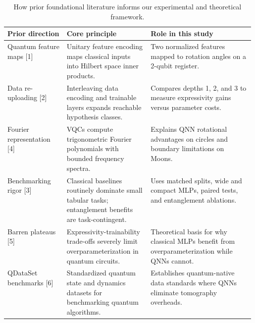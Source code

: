 \begin{table}[!htbp]
\centering\small
\caption{How prior foundational literature informs our experimental and theoretical framework.}
\begin{tabularx}{\linewidth}{@{}p{0.24\linewidth}>{\raggedright\arraybackslash}p{0.34\linewidth}>{\raggedright\arraybackslash}X@{}}
\toprule
Prior direction & Core principle & Role in this study\\
\midrule
Quantum feature maps [1] & Unitary feature encoding maps classical inputs into Hilbert space inner products. & Two normalized features mapped to rotation angles on a 2-qubit register.\\
Data re-uploading [2] & Interleaving data encoding and trainable layers expands reachable hypothesis classes. & Compares depths 1, 2, and 3 to measure expressivity gains versus parameter costs.\\
Fourier representation [4] & VQCs compute trigonometric Fourier polynomials with bounded frequency spectra. & Explains QNN rotational advantages on circles and boundary limitations on Moons.\\
Benchmarking rigor [3] & Classical baselines routinely dominate small tabular tasks; entanglement benefits are task-contingent. & Uses matched splits, wide and compact MLPs, paired tests, and entanglement ablations.\\
Barren plateaus [5] & Expressivity-trainability trade-offs severely limit overparameterization in quantum circuits. & Theoretical basis for why classical MLPs benefit from overparameterization while QNNs cannot.\\
QDataSet benchmarks [6] & Standardized quantum state and dynamics datasets for benchmarking quantum algorithms. & Establishes quantum-native data standards where QNNs eliminate tomography overheads.\\
\bottomrule
\end{tabularx}
\end{table}
